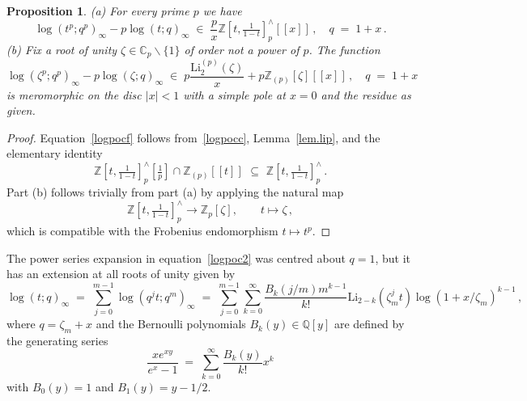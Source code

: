 \documentclass[12pt,reqno]{amsart}
\newtheorem{proposition}{Proposition}[section]
\theoremstyle{definition}
\def\BZ{\mathbb Z}
\def\BQ{\mathbb Q}
\def\BC{\mathbb C}
\def\Li{\mathrm{Li}}
\def\be{\begin{equation}}
\def\ee{\end{equation}}
\def\z{\zeta}
\def\={\;=\;}
\def\inn{\;\in\;}
\begin{document}
\begin{proposition}
\label{prop.poclip}
\emph{(}a\emph{)} For every prime $p$ we have 
\be
\label{logpocf}
\log(t^p;q^p)_\infty-p \log(t;q)_\infty \inn
\frac{p}{x}\BZ[t,\tfrac{1}{1-t}]^\wedge_p [\![x]\!]\,,\quad q\=1+x \,.
\ee
\emph{(}b\emph{)} Fix a root of unity $\z \in \BC_p\smallsetminus \{1\}$ of order
not a power of $p$. The function
\be
\label{eq.cor.logpoc}
\log(\z^p;q^p)_{\infty}
-
p\log(\z;q)_{\infty}
\inn
p\frac{\Li_{2}^{(p)}(\z)}{x}
+p\BZ_{(p)}[\z][\![x]\!]\,,\quad q\=1+x
\ee
is meromorphic on the disc $|x|<1$ with a simple pole at $x=0$ and the residue as
given. 
\end{proposition}

\begin{proof}
Equation~\eqref{logpocf} follows from~\eqref{logpocc}, Lemma~\ref{lem.lip},
and the elementary identity
\be
\label{elem}
\BZ[t,\tfrac{1}{1-t}]^\wedge_p [\tfrac{1}{p}] \cap
\BZ_{(p)}[\![t]\!] \,\, \subseteq \,\,   \BZ[t,\tfrac{1}{1-t}]^\wedge_p \,.
\ee
Part (b) follows trivially from part (a) by applying
the natural map
\be
\BZ[t,\tfrac{1}{1-t}]^\wedge_p \to \BZ_p[\z], \qquad t \mapsto \z \,,
\ee
which is compatible with the Frobenius endomorphism $t\mapsto t^p$.
\end{proof}


The power series expansion in equation~\eqref{logpoc2} was centred about $q=1$,
but it has an extension at all roots of unity given by
\be
\label{logpocm}
\log  (t;q)_{\infty}
\=
\sum_{j=0}^{m-1} \log (q^jt;q^m)_{\infty}
\=
\sum_{j=0}^{m-1}\sum_{k=0}^{\infty}
\frac{B_{k}(j/m)m^{k-1}}{k!}
\Li_{2-k}(\z_m^j t)\log(1+x/\z_m)^{k-1} \,,
\ee
where $q=\z_{m}+x$ and the Bernoulli polynomials $B_k(y) \in \BQ[y]$
are defined by the generating series 
\be
\label{bern}
\frac{xe^{xy}}{e^x-1} \= \sum_{k=0}^\infty \frac{B_k(y)}{k!} x^k
\ee
with $B_0(y)=1$ and $B_1(y)=y-1/2$.
\end{document}
